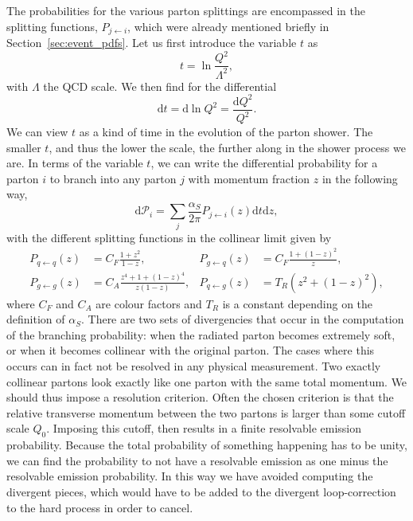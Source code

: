The probabilities for the various parton splittings are encompassed in the splitting functions,
$P_{j\leftarrow i}$, which were already mentioned briefly in Section~\ref{sec:event_pdfs}.
Let us first introduce the variable $t$ as
\begin{equation}
  t = \ln\frac{Q^2}{\Lambda^2},
\end{equation}
with $\Lambda$ the QCD scale. We then find for the differential
\begin{equation}
  \text{d}t = \text{d}\ln Q^2 = \frac{\text{d}Q^2}{Q^2}.
\end{equation}
We can view $t$ as a kind of time in the evolution of the parton shower. The smaller $t$, and
thus the lower the scale, the further along in the shower process we are. 
In terms of the variable $t$, we can write the differential probability for a parton $i$ to branch
into any parton $j$ with momentum fraction $z$ in the following way,
\begin{equation}
  \text{d}\mathcal{P}_i = \sum_j \frac{\alpha_S}{2\pi} P_{j\leftarrow i}(z)\text{d}t\text{d}z,
\label{eq:splitting}
\end{equation}
with the different splitting functions in the collinear limit given by
\begin{align}
  P_{q\leftarrow q}(z) &= C_F \frac{1 + z^2}{1 - z}, & 
  P_{g\leftarrow q}(z) &= C_F \frac{1 + (1-z)^2}{z}, \\
  P_{g\leftarrow g}(z) &= C_A \frac{z^4 + 1 + (1-z)^4}{z(1-z)}, &
  P_{q\leftarrow g}(z) &= T_R (z^2 + (1-z)^2), 
\end{align}
where $C_F$ and $C_A$ are colour factors and $T_R$ is a constant depending on the definition of
$\alpha_S$. 
There are two sets of divergencies that occur in the computation of the branching probability: when
the radiated parton becomes extremely soft, or when it becomes collinear with the original parton. 
The cases where this occurs can in fact not be resolved in any physical measurement. Two exactly
collinear partons look exactly like one parton with the same total momentum. We should thus impose
a resolution criterion. Often the chosen criterion is that the relative transverse momentum
between the two partons is larger than some cutoff scale $Q_0$. Imposing this cutoff, then results
in a finite resolvable emission probability. Because the total probability of something happening
has to be unity, we can find the probability to not have a resolvable emission as one minus the
resolvable emission probability. In this way we have avoided computing the divergent pieces, which
would have to be added to the divergent loop-correction to the hard process in order to cancel.

